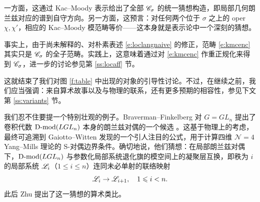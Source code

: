 一方面，这通过 Kac--Moody 表示给出了全部 $\mathscr{C}_{\sigma}$ 的统一猜想构造，即局部几何朗兰兹对应的谱到自守方向。另一方面，这预言：对任何两个位于 $\sigma$ 之上的 oper $\chi, \chi'$，相应的 Kac--Moody 模范畴等价——这本身就是表示论中一个深刻的猜想。

\begin{re} 事实上，由于尚未解释的、对朴素表述 \eqref{e:loclangnaive} 的修正，范畴 \eqref{e:kmcenc} 其实只是 $\mathscr{C}_{\sigma}$ 的全子范畴。实践上，这意味着通过对 \eqref{e:kmcenc} 作重正规化来得到 $\mathscr{C}_{\sigma}$，进一步的讨论参见第 \ref{ss:locaff} 节。\end{re}

\ssszh 这就结束了我们对图 \ref{f:table} 中出现的对象的引导性讨论。不过，在继续之前，我们应当强调：来自算术故事以及与物理的联系，还有更多预期的相容性，参见下文第 \ref{ss:variants} 节。

我们忍不住要提一个特别壮观的例子。Braverman--Finkelberg 对 $G = GL_n$ 提出了卷积代数 $\operatorname{D-mod}(LGL_n)$ 本身的朗兰兹对偶的一个候选 \cite{bravermanfinkelbergconjecturecoloumb}。这基于物理上的考虑，最终可追溯到 Gaiotto--Witten \cite{gaiottowitten} 发现的一个引人注目的公式，用于计算四维 $\mathscr{N}=4$ Yang--Mills 理论的 S-对偶边界条件。确切地说，他们猜想：在局部朗兰兹对偶下，$\operatorname{D-mod}(LGL_n)$ 与参数化局部系统退化旗的模空间上的凝聚层互换，即秩为 $i$ 的局部系统 $\mathscr{L}_i$（$1 \leqslant i \leqslant n$）连同未必单射的联络映射
\[
\mathscr{L}_i \rightarrow \mathscr{L}_{i+1}, \quad 1 \leqslant i < n.
\]
此后 Zhu \cite{zhufamilies} 提出了这一猜想的算术类比。
